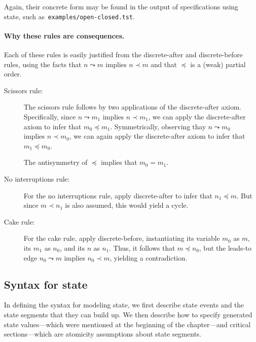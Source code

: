 Again, their concrete form may be found in the output of {\cpsa}
specifications using state, such as~\texttt{examples/open-closed.tst}.

\paragraph{Why these rules are consequences.}  Each of these rules is
easily justified from the discrete-after and discrete-before rules,
using the facts that $n\leadsto m$ implies $n\prec m$ and that
$\preceq$ is a (weak) partial order.

\begin{description}
  \item[Scissors rule:]  The scissors rule follows by two applications
  of the discrete-after axiom.  Specifically, since $n\leadsto m_1$
  implies $n\prec m_1$, we can apply the discrete-after axiom to infer
  that $m_0\preceq m_1$.  Symmetrically, observing thay
  $n\leadsto m_0$ implies $n\prec m_0$, we can again apply the
  discrete-after axiom to infer that $m_1\preceq m_0$.

  The antisymmetry of $\preceq$ implies that $m_0=m_1$.
  \item[No interruptions rule:]  For the no interruptions rule, apply
  discrete-after to infer that $n_1\preceq m$.  But since
  $m \prec n_1$ is also assumed, this would yield a cycle.
  \item[Cake rule:]  For the cake rule, apply discrete-before,
  instantiating its variable $m_0$ as $m$, its $m_1$ as $n_0$, and its
  $n$ as $n_1$.  Thus, it follows that $m\preceq n_0$, but the
  leads-to edge $n_0\leadsto m$ implies $n_0\prec m$, yielding a
  contradiction.
\end{description}
   
\subsection{Syntax for state}
\label{sec:channels:state:syntax}

In defining the syntax for modeling state, we first describe state
events and the state segments that they can build up.  We then
describe how to specify generated state values---which were mentioned
at the beginning of the chapter---and critical sections---which are
atomicity assumptions about state segments.

